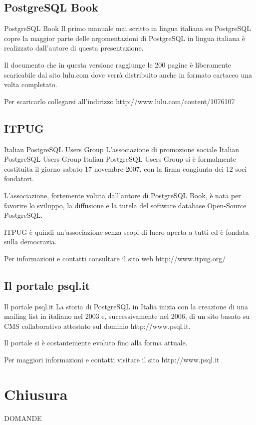 \documentclass{beamer}
\begin{document}
\subsection{PostgreSQL Book}
\begin{frame}{PostgreSQL Book}
Il primo manuale mai scritto in lingua italiana su PostgreSQL copre la maggior parte delle argomentazioni di PostgreSQL in lingua italiana è realizzato dall'autore di questa presentazione.

Il documento che in questa versione raggiunge le 200 pagine è liberamente scaricabile dal sito lulu.com dove verrà distribuito anche in formato cartaceo una volta completato.

Per scaricarlo collegarsi all'indirizzo http://www.lulu.com/content/1076107


\end{frame}

\subsection{ITPUG}
\begin{frame}{Italian PostgreSQL Users Group}
 L'associazione di promozione sociale Italian PostgreSQL Users Group Italian PostgreSQL Users Group si è formalmente costituita il giorno sabato 17 novembre 2007, con la firma congiunta dei 12 soci fondatori.

L'associazione, fortemente voluta dall'autore di PostgreSQL Book, è nata per favorire lo sviluppo, la diffusione e la tutela del software database Open-Source PostgreSQL.

ITPUG è quindi un'associazione senza scopi di lucro aperta a tutti ed è fondata sulla democrazia. 

Per informazioni e contatti consultare il sito web http://www.itpug.org/
\end{frame}

\subsection{Il portale psql.it}
\begin{frame}{Il portale psql.it}
 La storia di PostgreSQL in Italia inizia con la creazione di una mailing list in italiano nel 2003 e, successivamente nel 2006, di un sito basato su CMS collaborativo attestato sul dominio http://www.psql.it.

Il portale si è costantemente evoluto fino alla forma attuale.

Per maggiori informazioni e contatti visitare il sito http://www.psql.it
\end{frame}

\section{Chiusura}
\begin{frame}
\begin{center}
\begin{huge}DOMANDE\end{huge}\end{center}

\end{frame}

\begin{frame}
\titlepage 

\end{frame}
\end{document}
